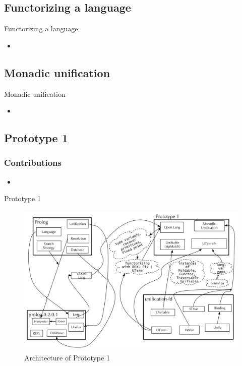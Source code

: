 \documentclass[hideothersubsections, t, aspectratio=1610]{beamer}
\begin{document}
\subsection{Functorizing a language}
\begin{frame}{Functorizing a language}
\begin{itemize}
\item
\end{itemize}

\end{frame}


\subsection{Monadic unification}
\begin{frame}{Monadic unification}
\begin{itemize}
\item
\end{itemize}

\end{frame}


\subsection{Prototype 1}
\begin{frame}
\frametitle{Contributions}
\begin{itemize}
\item
\end{itemize}
\end{frame}

\begin{frame}{Prototype 1}
\begin{figure}[H]
  \includegraphics[width=1\textwidth]{Prototype-1-architecture.jpeg}
  \caption{Architecture of Prototype 1}
  \label{fig:proto1-arch}
\end{figure}
\end{frame}
\end{document}
